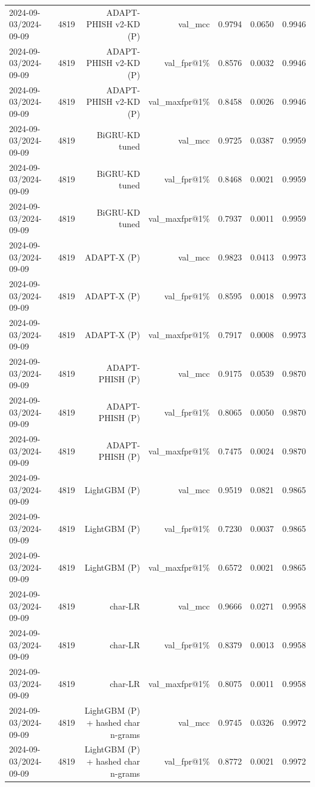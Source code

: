 \begin{table}[t]
\begin{tabular}{llrrrrr}
2024-09-03/2024-09-09 & 4819 & ADAPT-PHISH v2-KD (P) & val\_mcc & 0.9794 & 0.0650 & 0.9946 \\
2024-09-03/2024-09-09 & 4819 & ADAPT-PHISH v2-KD (P) & val\_fpr@1\% & 0.8576 & 0.0032 & 0.9946 \\
2024-09-03/2024-09-09 & 4819 & ADAPT-PHISH v2-KD (P) & val\_maxfpr@1\% & 0.8458 & 0.0026 & 0.9946 \\
2024-09-03/2024-09-09 & 4819 & BiGRU-KD tuned & val\_mcc & 0.9725 & 0.0387 & 0.9959 \\
2024-09-03/2024-09-09 & 4819 & BiGRU-KD tuned & val\_fpr@1\% & 0.8468 & 0.0021 & 0.9959 \\
2024-09-03/2024-09-09 & 4819 & BiGRU-KD tuned & val\_maxfpr@1\% & 0.7937 & 0.0011 & 0.9959 \\
2024-09-03/2024-09-09 & 4819 & ADAPT-X (P) & val\_mcc & 0.9823 & 0.0413 & 0.9973 \\
2024-09-03/2024-09-09 & 4819 & ADAPT-X (P) & val\_fpr@1\% & 0.8595 & 0.0018 & 0.9973 \\
2024-09-03/2024-09-09 & 4819 & ADAPT-X (P) & val\_maxfpr@1\% & 0.7917 & 0.0008 & 0.9973 \\
2024-09-03/2024-09-09 & 4819 & ADAPT-PHISH (P) & val\_mcc & 0.9175 & 0.0539 & 0.9870 \\
2024-09-03/2024-09-09 & 4819 & ADAPT-PHISH (P) & val\_fpr@1\% & 0.8065 & 0.0050 & 0.9870 \\
2024-09-03/2024-09-09 & 4819 & ADAPT-PHISH (P) & val\_maxfpr@1\% & 0.7475 & 0.0024 & 0.9870 \\
2024-09-03/2024-09-09 & 4819 & LightGBM (P) & val\_mcc & 0.9519 & 0.0821 & 0.9865 \\
2024-09-03/2024-09-09 & 4819 & LightGBM (P) & val\_fpr@1\% & 0.7230 & 0.0037 & 0.9865 \\
2024-09-03/2024-09-09 & 4819 & LightGBM (P) & val\_maxfpr@1\% & 0.6572 & 0.0021 & 0.9865 \\
2024-09-03/2024-09-09 & 4819 & char-LR & val\_mcc & 0.9666 & 0.0271 & 0.9958 \\
2024-09-03/2024-09-09 & 4819 & char-LR & val\_fpr@1\% & 0.8379 & 0.0013 & 0.9958 \\
2024-09-03/2024-09-09 & 4819 & char-LR & val\_maxfpr@1\% & 0.8075 & 0.0011 & 0.9958 \\
2024-09-03/2024-09-09 & 4819 & LightGBM (P) + hashed char n-grams & val\_mcc & 0.9745 & 0.0326 & 0.9972 \\
2024-09-03/2024-09-09 & 4819 & LightGBM (P) + hashed char n-grams & val\_fpr@1\% & 0.8772 & 0.0021 & 0.9972 \\

\end{tabular}
\end{table}
